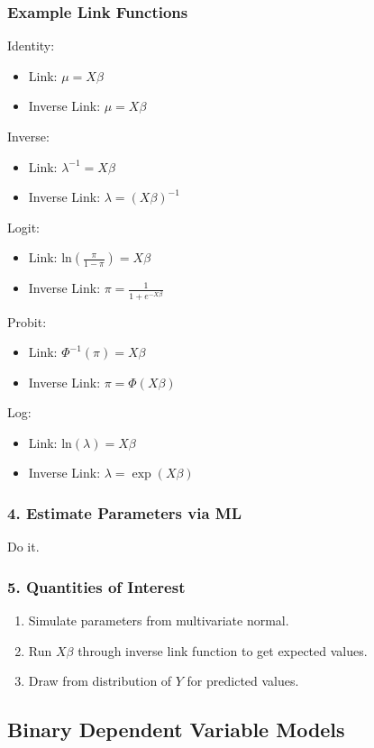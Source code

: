 \documentclass{beamer}
\begin{document}
\begin{frame}
\frametitle{Example Link Functions}
\pause
\footnotesize
Identity: 
\pause
\begin{itemize}
\item Link: $\mu = X\beta$ 
\pause
 \item Inverse Link: $\mu = X\beta$
\end{itemize}
\pause
Inverse:
\pause
\begin{itemize}
\item Link: $\lambda^{-1} = X\beta$
\pause 
\item Inverse Link:  $\lambda = (X\beta)^{-1}$
\end{itemize}
\pause
Logit: 
\pause
\begin{itemize}
\item Link: $\mathrm{ln} \left( \frac{\pi}{1-\pi} \right) = X\beta$
\pause 
\item Inverse Link: $\pi = \frac{1}{1 + e^{-X\beta}} $
\end{itemize}
\pause
Probit: 
\pause
\begin{itemize}
\item Link: $\Phi^{-1}(\pi) = X\beta$
\pause 
\item Inverse Link: $\pi = \Phi(X\beta) $
\end{itemize}
\pause
Log:
\pause
\begin{itemize}
\item Link: $\mathrm{ln}(\lambda) = X\beta$
\pause 
\item Inverse Link: $\lambda = \exp(X\beta) $
\end{itemize}
\end{frame}

\begin{frame}
\frametitle{4. Estimate Parameters via ML}
\pause
Do it.
\end{frame}

\begin{frame}
\frametitle{5. Quantities of Interest}
\pause
\begin{enumerate}
\item Simulate parameters from multivariate normal.
\pause
\item Run $X\beta$ through inverse link function to get expected values.
\pause
\item Draw from distribution of $Y$ for predicted values.
\end{enumerate}
\end{frame}

\subsection{Binary Dependent Variable Models}
\end{document}
